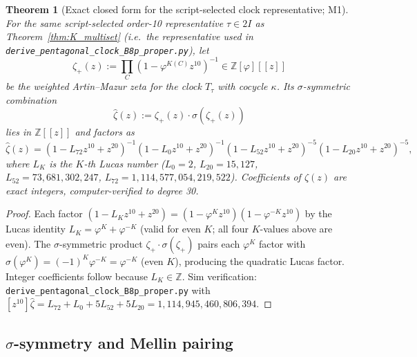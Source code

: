 \documentclass[11pt, a4paper]{amsart}
\newtheorem{theorem}{Theorem}[section]
\theoremstyle{definition}
\begin{document}
\begin{theorem}[Exact closed form for the script-selected clock representative; M1]\label{thm:zhat_form}
For the same script-selected order-10 representative $\tau \in 2I$
as Theorem~\ref{thm:K_multiset} (i.e.\ the representative used in
\texttt{derive\_pentagonal\_clock\_B8p\_proper.py}), let
\[
\zeta_+(z) := \prod_{C} (1 - \varphi^{K(C)} z^{10})^{-1}
  \in \mathbb{Z}[\varphi][[z]]
\]
be the weighted Artin--Mazur zeta for the clock $T_\tau$ with cocycle
$\kappa$. Its $\sigma$-symmetric combination
\[
\widehat\zeta(z) := \zeta_+(z) \cdot \sigma(\zeta_+(z))
\]
lies in $\mathbb{Z}[[z]]$ and factors as
\[
\widehat\zeta(z) = (1 - L_{72} z^{10} + z^{20})^{-1}
  (1 - L_0 z^{10} + z^{20})^{-1}
  (1 - L_{52} z^{10} + z^{20})^{-5}
  (1 - L_{20} z^{10} + z^{20})^{-5},
\]
where $L_K$ is the $K$-th Lucas number ($L_0 = 2$, $L_{20} = 15{,}127$,
$L_{52} = 73{,}681{,}302{,}247$, $L_{72} = 1{,}114{,}577{,}054{,}219{,}522$).
Coefficients of $\widehat\zeta(z)$ are exact integers, computer-verified to
degree 30.
\end{theorem}

\begin{proof}
Each factor $(1 - L_K z^{10} + z^{20}) = (1 - \varphi^K z^{10})(1 - \varphi^{-K} z^{10})$
by the Lucas identity $L_K = \varphi^K + \varphi^{-K}$ (valid for even $K$;
all four $K$-values above are even). The $\sigma$-symmetric product
$\zeta_+ \cdot \sigma(\zeta_+)$ pairs each $\varphi^K$ factor with
$\sigma(\varphi^K) = (-1)^K \varphi^{-K} = \varphi^{-K}$ (even $K$),
producing the quadratic Lucas factor. Integer coefficients follow
because $L_K \in \mathbb{Z}$. Sim verification:
\texttt{derive\_pentagonal\_clock\_B8p\_proper.py} with $[z^{10}]
\widehat\zeta = L_{72} + L_0 + 5 L_{52} + 5 L_{20} = 1{,}114{,}945{,}460{,}806{,}394$.
\end{proof}

\subsection{$\sigma$-symmetry and Mellin pairing}\label{subsec:zhat_sym}
\end{document}
